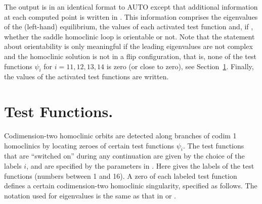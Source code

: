 \documentclass[12pt]{report}
\begin{document}
The output is in an identical format to {\cal AUTO} except that
additional information at each computed point is written 
in . This information comprises the eigenvalues of
the (left-hand) equilibrium, the values of each activated test
function and, if , 
whether the saddle homoclinic loop is orientable
or not.
Note that the statement about orientability is only meaningful if the
leading eigenvalues are not complex and the homoclinic solution is not
in a flip configuration, that is, none of the test functions 
$\psi_i$ for $i=11,12,13,14$ is zero (or close to zero), 
see Section~\ref{sec:HomCont_Test_functions}.
 Finally, the values of the  activated test functions are written. 

\section{ Test Functions.} \label{sec:HomCont_Test_functions}
Codimension-two homoclinic orbits are detected along branches of codim
1 homoclinics by locating zeroes of certain test functions
$\psi_i$. The test functions that are ``switched on'' during any
continuation are given by the choice of the labels $i$, and are
specified by the parameters  in .  Here  gives the labels of
the test functions (numbers between 1 and 16). A zero of
each labeled test function defines a certain codimension-two 
homoclinic singularity, specified as follows.
The notation used for eigenvalues is the same as that in
 or . 
\end{document}
